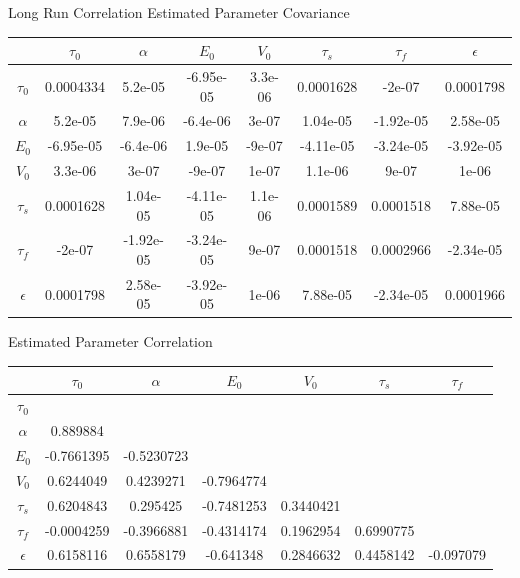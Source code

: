 \documentclass{beamer}
\begin{document}
\begin{frame}{Long Run Correlation}
\centering
Estimated Parameter Covariance 

\begin{table}[t]
\tiny
\begin{tabular}{|c | c  c  c  c  c  c  c |}
\hline
  & $\tau_0$ & $\alpha$ & $E_0$    & $V_0$    & $\tau_s$ & $\tau_f$ & $\epsilon$ \\
\hline
\rowcolor[gray]{.8} $\tau_0$  & 0.0004334 & 5.2e-05 & -6.95e-05 & 3.3e-06 & 0.0001628 & -2e-07 & 0.0001798 \\
$\alpha$                      & 5.2e-05 & 7.9e-06 & -6.4e-06 & 3e-07 & 1.04e-05 & -1.92e-05 & 2.58e-05 \\
\rowcolor[gray]{.8} $E_0$     & -6.95e-05 & -6.4e-06 & 1.9e-05 & -9e-07 & -4.11e-05 & -3.24e-05 & -3.92e-05 \\
$V_0$                         & 3.3e-06 & 3e-07 & -9e-07 & 1e-07 & 1.1e-06 & 9e-07 & 1e-06 \\
\rowcolor[gray]{.8} $\tau_s$  & 0.0001628 & 1.04e-05 & -4.11e-05 & 1.1e-06 & 0.0001589 & 0.0001518 & 7.88e-05 \\
$\tau_f$                      & -2e-07 & -1.92e-05 & -3.24e-05 & 9e-07 & 0.0001518 & 0.0002966 & -2.34e-05 \\
\rowcolor[gray]{.8} $\epsilon$& 0.0001798 & 2.58e-05 & -3.92e-05 & 1e-06 & 7.88e-05 & -2.34e-05 & 0.0001966 \\
\hline
\end{tabular}
\label{tab:long_cov}
\end{table}

Estimated Parameter Correlation 

\begin{table}[t]
\tiny
\begin{tabular}{|c | c  c  c  c  c  c  |}
\hline
  & $\tau_0$ & $\alpha$ & $E_0$    & $V_0$    & $\tau_s$ & $\tau_f$  \\
\hline
\rowcolor[gray]{.8} $\tau_0$  & & & & & & \\
$\alpha$                      & 0.889884 & & & & & \\
\rowcolor[gray]{.8} $E_0$     & -0.7661395 & -0.5230723 & & & & \\
$V_0$                         & 0.6244049 & 0.4239271 & -0.7964774 & & & \\
\rowcolor[gray]{.8} $\tau_s$  & 0.6204843 & 0.295425 & -0.7481253 & 0.3440421 & & \\
$\tau_f$                      & -0.0004259 & -0.3966881 & -0.4314174 & 0.1962954 & 0.6990775 & \\
\rowcolor[gray]{.8} $\epsilon$& 0.6158116 & 0.6558179 & -0.641348 & 0.2846632 & 0.4458142 & -0.097079 \\
\hline
\end{tabular}
\label{tab:long_corr}
\end{table}
\end{frame}
\end{document}
